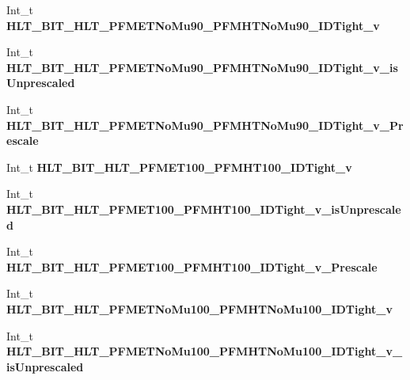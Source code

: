 \begin{DoxyCompactItemize}
\item 
\hypertarget{classMiniTree_ac5f86fdf04a0a107b1ed9b30c350083c}{}\label{classMiniTree_ac5f86fdf04a0a107b1ed9b30c350083c} 
Int\+\_\+t {\bfseries H\+L\+T\+\_\+\+B\+I\+T\+\_\+\+H\+L\+T\+\_\+\+P\+F\+M\+E\+T\+No\+Mu90\+\_\+\+P\+F\+M\+H\+T\+No\+Mu90\+\_\+\+I\+D\+Tight\+\_\+v}
\item 
\hypertarget{classMiniTree_a5ff63f296e908fa9533a8e96a4ed6215}{}\label{classMiniTree_a5ff63f296e908fa9533a8e96a4ed6215} 
Int\+\_\+t {\bfseries H\+L\+T\+\_\+\+B\+I\+T\+\_\+\+H\+L\+T\+\_\+\+P\+F\+M\+E\+T\+No\+Mu90\+\_\+\+P\+F\+M\+H\+T\+No\+Mu90\+\_\+\+I\+D\+Tight\+\_\+v\+\_\+is\+Unprescaled}
\item 
\hypertarget{classMiniTree_a104074dd7a182bf40ffc8e2c589b0822}{}\label{classMiniTree_a104074dd7a182bf40ffc8e2c589b0822} 
Int\+\_\+t {\bfseries H\+L\+T\+\_\+\+B\+I\+T\+\_\+\+H\+L\+T\+\_\+\+P\+F\+M\+E\+T\+No\+Mu90\+\_\+\+P\+F\+M\+H\+T\+No\+Mu90\+\_\+\+I\+D\+Tight\+\_\+v\+\_\+\+Prescale}
\item 
\hypertarget{classMiniTree_ac3e7d70e3e4107ff1fa597fbee83262d}{}\label{classMiniTree_ac3e7d70e3e4107ff1fa597fbee83262d} 
Int\+\_\+t {\bfseries H\+L\+T\+\_\+\+B\+I\+T\+\_\+\+H\+L\+T\+\_\+\+P\+F\+M\+E\+T100\+\_\+\+P\+F\+M\+H\+T100\+\_\+\+I\+D\+Tight\+\_\+v}
\item 
\hypertarget{classMiniTree_a6c2bc5af8732f0a7f1c332e32d28ecd5}{}\label{classMiniTree_a6c2bc5af8732f0a7f1c332e32d28ecd5} 
Int\+\_\+t {\bfseries H\+L\+T\+\_\+\+B\+I\+T\+\_\+\+H\+L\+T\+\_\+\+P\+F\+M\+E\+T100\+\_\+\+P\+F\+M\+H\+T100\+\_\+\+I\+D\+Tight\+\_\+v\+\_\+is\+Unprescaled}
\item 
\hypertarget{classMiniTree_a832463338697d7bff9a67cc381bc93d9}{}\label{classMiniTree_a832463338697d7bff9a67cc381bc93d9} 
Int\+\_\+t {\bfseries H\+L\+T\+\_\+\+B\+I\+T\+\_\+\+H\+L\+T\+\_\+\+P\+F\+M\+E\+T100\+\_\+\+P\+F\+M\+H\+T100\+\_\+\+I\+D\+Tight\+\_\+v\+\_\+\+Prescale}
\item 
\hypertarget{classMiniTree_a24184ada70e654d1ffb9e826528c0b6b}{}\label{classMiniTree_a24184ada70e654d1ffb9e826528c0b6b} 
Int\+\_\+t {\bfseries H\+L\+T\+\_\+\+B\+I\+T\+\_\+\+H\+L\+T\+\_\+\+P\+F\+M\+E\+T\+No\+Mu100\+\_\+\+P\+F\+M\+H\+T\+No\+Mu100\+\_\+\+I\+D\+Tight\+\_\+v}
\item 
\hypertarget{classMiniTree_a25d7bfa9b4a4f19ee9ad1c506d4b8151}{}\label{classMiniTree_a25d7bfa9b4a4f19ee9ad1c506d4b8151} 
Int\+\_\+t {\bfseries H\+L\+T\+\_\+\+B\+I\+T\+\_\+\+H\+L\+T\+\_\+\+P\+F\+M\+E\+T\+No\+Mu100\+\_\+\+P\+F\+M\+H\+T\+No\+Mu100\+\_\+\+I\+D\+Tight\+\_\+v\+\_\+is\+Unprescaled}
\item 

\end{DoxyCompactItemize}
